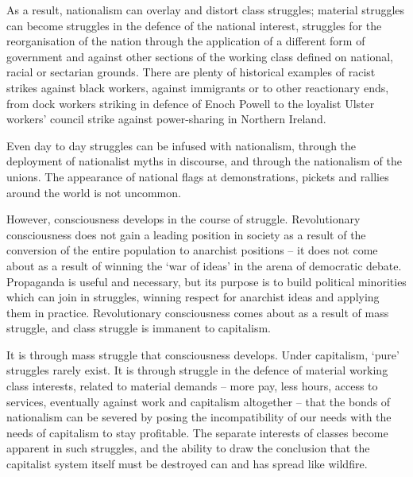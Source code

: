 As a result, nationalism can overlay and distort class struggles; material struggles can become struggles in the defence of the national interest, struggles for the reorganisation of the nation through the application of a different form of government and against other sections of the working class defined on national, racial or sectarian grounds. There are plenty of historical examples of racist strikes against black workers, against immigrants or to other reactionary ends, from dock workers striking in defence of Enoch Powell to the loyalist Ulster workers’ council strike against power-sharing in Northern Ireland.

Even day to day struggles can be infused with nationalism, through the deployment of nationalist myths in discourse, and through the nationalism of the unions. The appearance of national flags at demonstrations, pickets and rallies around the world is not uncommon.

However, consciousness develops in the course of struggle. Revolutionary consciousness does not gain a leading position in society as a result of the conversion of the entire population to anarchist positions – it does not come about as a result of winning the ‘war of ideas’ in the arena of democratic debate. Propaganda is useful and necessary, but its purpose is to build political minorities which can join in struggles, winning respect for anarchist ideas and applying them in practice. Revolutionary consciousness comes about as a result of mass struggle, and class struggle is immanent to capitalism.

It is through mass struggle that consciousness develops. Under capitalism, ‘pure’ struggles rarely exist. It is through struggle in the defence of material working class interests, related to material demands – more pay, less hours, access to services, eventually against work and capitalism altogether – that the bonds of nationalism can be severed by posing the incompatibility of our needs with the needs of capitalism to stay profitable. The separate interests of classes become apparent in such struggles, and the ability to draw the conclusion that the capitalist system itself must be destroyed can and has spread like wildfire.


